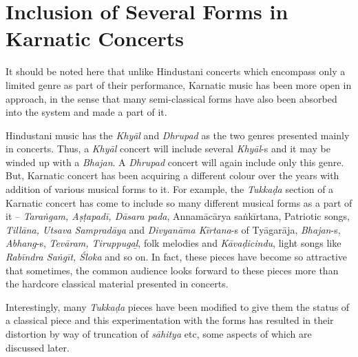 \vspace{-.3cm}

\section*{Inclusion of Several Forms in Karnatic Concerts}

It should be noted here that unlike Hindustani concerts which encompass only a limited genre as part of their performance, Karnatic music has been more open in approach, in the sense that many semi-classical forms have also been absorbed into the system and made a part of it.

Hindustani music has the \textit{Khyāl} and \textit{Dhrupad} as the two genres presented mainly in concerts. Thus, a \textit{Khyāl} concert will include several \textit{Khyāl}-s and it may be winded up with a \textit{Bhajan}. A \textit{Dhrupad} concert will again include only this genre. But, Karnatic concert has been acquiring a different colour over the years with addition of various musical forms to it. For example, the \textit{Tukkaḍa} section of a Karnatic concert has come to include so many different musical forms as a part of it – \textit{Taraṅgam, Aṣṭapadī, Dāsara pada}, Annamācārya saṅkīrtana, Patriotic songs, \textit{Tillāna, Utsava Sampradāya} and \textit{Divyanāma Kīrtana}-s of Tyāgarāja, \textit{Bhajan}-s, \textit{Abhang}-s, \textit{Tevāram, Tiruppugaḻ}, folk melodies and \textit{Kāvaḍicindu}, light songs like \textit{Rabīndra Saṅgīt, Śloka} and so on. In fact, these pieces have become so attractive that sometimes, the common audience looks forward to these pieces more than the hardcore classical material presented in concerts.

Interestingly, many \textit{Tukkaḍa} pieces have been modified to give them the status of a classical piece and this experimentation with the forms has resulted in their distortion by way of truncation of \textit{sāhitya} etc, some aspects of which are discussed later.

